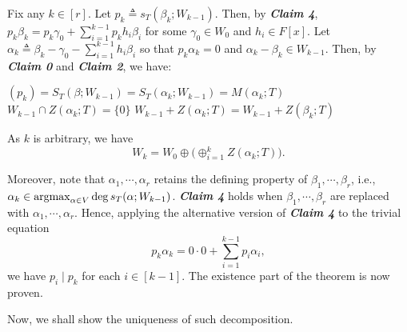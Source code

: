\documentclass[MAS212_Note.tex]{subfiles}
\begin{document}
{    Fix any \(k \in [r]\).
    Let \(p_k \triangleq s_T(\beta_k; W_{k-1})\).
    Then, by \textbf{\textit{Claim 4}},
    \(p_k \beta_k = p_k \gamma_0 + \sum_{i=1}^{k-1} p_k h_i \beta_i\)
    for some \(\gamma_0 \in W_0\) and \(h_i \in F[x]\).
    Let \(\alpha_k \triangleq \beta_k - \gamma_0 - \sum_{i=1}^{k-1} h_i \beta_i\)
    so that \(p_k \alpha_k = 0\) and \(\alpha_k - \beta_k \in W_{k-1}\).
    Then, by \textbf{\textit{Claim 0}} and  \textbf{\textit{Claim 2}},
    we have:
    \begin{itemize}[nolistsep]
        \ii \((p_k) = S_T(\beta; W_{k-1}) =  S_T(\alpha_k; W_{k-1}) = M(\alpha_k; T)\)
        \ii \(W_{k-1} \cap Z(\alpha_k; T) = \{0\}\)
        \ii \(W_{k-1} + Z(\alpha_k; T) = W_{k-1} + Z(\beta_k; T)\)
    \end{itemize}
    As \(k\) is arbitrary, we have
    \[
        W_k = W_0 \oplus \big(\oplus_{i=1}^k Z(\alpha_k; T)\big).
    \]

    Moreover, note that \(\alpha_1, \cdots, \alpha_r\) retains the defining property
    of \(\beta_1, \cdots, \beta_r\),
    i.e., \(\alpha_k \in \operatorname*{arg max}_{\alpha \in V} \deg s_T(\alpha; W_{k-1})\).
    \textbf{\textit{Claim 4}} holds when \(\beta_1, \cdots, \beta_r\)
    are replaced with \(\alpha_1, \cdots, \alpha_r\).
    Hence, applying the alternative version of \textbf{\textit{Claim 4}}
    to the trivial equation
    \[
        \textstyle p_k \alpha_k = 0 \cdot 0 + \sum_{i=1}^{k-1} p_i \alpha_i,
    \]
    we have \(p_i \mid p_k\) for each \(i \in [k - 1]\).
    The existence part of the theorem is now proven.

    Now, we shall show the uniqueness of such decomposition.
}

\end{document}
